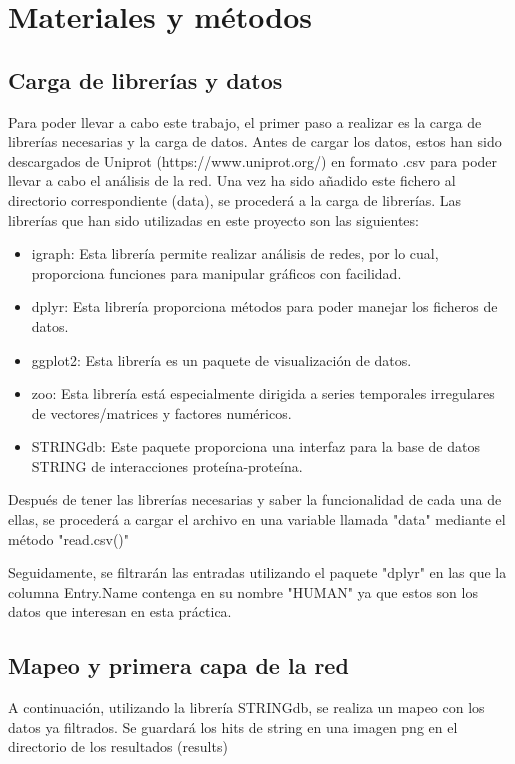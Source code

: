 \section{Materiales y métodos}
\subsection{Carga de librerías y datos}
Para poder llevar a cabo este trabajo, el primer paso a realizar es la carga de librerías necesarias y la carga de datos. Antes de cargar los datos, estos han sido descargados de Uniprot (https://www.uniprot.org/) en formato .csv para poder llevar a cabo el análisis de la red.
Una vez ha sido añadido este fichero al directorio correspondiente (data), se procederá a la carga de librerías.
Las librerías que han sido utilizadas en este proyecto son las siguientes:
\begin{itemize}
	\item igraph: Esta librería permite realizar análisis de redes, por lo cual, proporciona funciones para manipular gráficos con facilidad.
	\item dplyr: Esta librería proporciona métodos para poder manejar los ficheros de datos.
	\item ggplot2: Esta librería es un paquete de visualización de datos.
	\item zoo: Esta librería está especialmente dirigida a series temporales irregulares de vectores/matrices y factores numéricos. 
	\item STRINGdb: Este paquete proporciona una interfaz para la base de datos STRING de interacciones proteína-proteína.
\end{itemize}

Después de tener las librerías necesarias y saber la funcionalidad de cada una de ellas, se procederá a cargar el archivo en una variable llamada "data" mediante el método "read.csv()"

Seguidamente, se filtrarán las entradas utilizando el paquete "dplyr" en las que la columna Entry.Name contenga en su nombre "HUMAN" ya que estos son los datos que interesan en esta práctica.

\subsection{Mapeo y primera capa de la red}
A continuación, utilizando la librería STRINGdb, se realiza un mapeo con los datos ya filtrados. Se guardará los hits de string en una imagen png en el directorio de los resultados (results)

